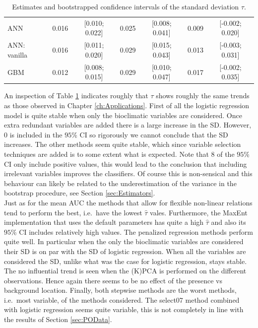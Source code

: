 \begin{table}[!htb]
{\begin{tabular}{lcccccc}
ANN                               & 0.016 &  [0.010; 0.022] & 0.025  & [0.008; 0.041] & 0.009  &  [-0.002; 0.020]   \\
ANN: vanilla                      & 0.016 &  [0.011; 0.020] & 0.029  & [0.015; 0.043] & 0.013  &  [-0.003; 0.031]   \\
GBM                               & 0.012 &  [0.008; 0.015] & 0.029  & [0.010; 0.047] & 0.017  &  [-0.002; 0.035]   \\
\bottomrule
\end{tabular}}
\caption{\label{tab:SDSimulation}Estimates and bootstrapped confidence intervals of the standard deviation $\tau$.}
\end{table}

An inspection of Table \ref{tab:SDSimulation} indicates roughly that $\tau$ shows roughly the same trends as those observed in Chapter \ref{ch:Applications}. First of all the logistic regression model is quite stable when only the bioclimatic variables are considered. Once extra redundant variables are added there is a large increase in the SD. However, $0$ is included in the $95$\% CI so rigorously we cannot conclude that the SD increases. The other methods seem quite stable, which since variable selection techniques are added is to some extent what is expected. Note that $8$ of the $95$\% CI only include positive values, this would lead to the conclusion that including irrelevant variables improves the classifiers. Of course this is non-sensical and this behaviour can likely be related to the underestimation of the variance in the bootstrap procedure, see Section \ref{sec:Estimators}. \\

Just as for the mean AUC the methods that allow for flexible non-linear relations tend 
to perform the best, i.e.\ have the lowest $\hat{\tau}$ vales. Furthermore, the MaxEnt implementation that uses the default parameters has quite a high $\hat{\tau}$ and also its $95$\% CI includes relatively high values. The penalized regression methods perform quite well. In particular when the only the bioclimatic variables are considered their SD is on par with the SD of logistic regression. When all the variables are considered the SD, unlike what was the case for logistic regression, stays stable. The no influential trend is seen when the (K)PCA is performed on the different observations. Hence again there seems to be no effect of the presence vs background location. Finally, both stepwise methods are the worst methods, i.e.\ most variable, of the methods considered. The select07 method combined with logistic regression seems quite variable, this is not completely in line with the results of Section \ref{sec:POData}. \\

